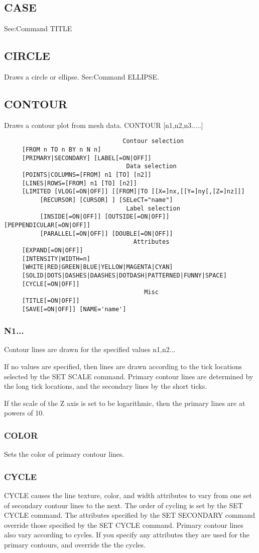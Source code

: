 \subsection{CASE}
See:Command TITLE 
\subsection{CIRCLE}
Draws a circle or ellipse.  See:Command ELLIPSE.  
\subsection{CONTOUR}
Draws a contour plot from mesh data.  
CONTOUR [n1,n2,n3.....] 
\begin{verbatim}
                                 Contour selection
     [FROM n TO n BY n N n] 
     [PRIMARY|SECONDARY] [LABEL[=ON|OFF]] 
                                  Data selection
     [POINTS|COLUMNS=[FROM] n1 [TO] [n2]] 
     [LINES|ROWS=[FROM] n1 [TO] [n2]] 
     [LIMITED [VLOG[=ON|OFF]] [[FROM]|TO [[X=]nx,[[Y=]ny[,[Z=]nz]]]
          [RECURSOR] [CURSOR] ] [SELeCT="name"] 
                                  Label selection
          [INSIDE[=ON|OFF]] [OUTSIDE[=ON|OFF]] [PEPPENDICULAR[=ON|OFF]]
          [PARALLEL[=ON|OFF]] [DOUBLE[=ON|OFF]] 
                                    Attributes
     [EXPAND[=ON|OFF]] 
     [INTENSITY|WIDTH=n] 
     [WHITE|RED|GREEN|BLUE|YELLOW|MAGENTA|CYAN] 
     [SOLID|DOTS|DASHES|DAASHES|DOTDASH|PATTERNED|FUNNY|SPACE] 
     [CYCLE[=ON|OFF]] 
                                       Misc
     [TITLE[=ON|OFF]] 
     [SAVE[=ON|OFF]] [NAME='name'] 
\end{verbatim}
\subsubsection{N1...}
Contour lines are drawn for the specified values n1,n2...  

If  no values are specified, then lines are drawn according to the tick
locations selected by the SET SCALE command.  Primary contour lines are
determined  by  the long tick locations, and the secondary lines by the
short ticks.  

If  the  scale of the Z axis is set to be logarithmic, then the primary
lines are at powers of 10.  
\subsubsection{COLOR}
Sets the color of primary contour lines.  
\subsubsection{CYCLE}
CYCLE causes the line texture, color, and width attributes to vary from
one set of secondary contour lines to the next.  The order  of  cycling
is  set  by the SET CYCLE command.  The attributes specified by the SET
SECONDARY command override those specified by the  SET  CYCLE  command.
Primary  contour  lines  also vary according to cycles.  If you specify
any attributes they are used for the primary contours, and override the
the cycles.  
